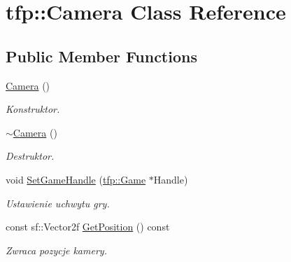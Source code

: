 \hypertarget{classtfp_1_1_camera}{}\section{tfp\+:\+:Camera Class Reference}
\label{classtfp_1_1_camera}
\subsection*{Public Member Functions}
\begin{DoxyCompactItemize}
\item 
\mbox{\label{classtfp_1_1_camera_a9d0ed540630dbb0cfe14ebde50695301}} 
\mbox{\hyperlink{classtfp_1_1_camera_a9d0ed540630dbb0cfe14ebde50695301}{Camera}} ()
\begin{DoxyCompactList}\small\item\em Konstruktor. \end{DoxyCompactList}\item 
\mbox{\label{classtfp_1_1_camera_a92dd247d1ec0dc12065eabcbba7a046a}} 
\mbox{\hyperlink{classtfp_1_1_camera_a92dd247d1ec0dc12065eabcbba7a046a}{$\sim$\+Camera}} ()
\begin{DoxyCompactList}\small\item\em Destruktor. \end{DoxyCompactList}\item 
\mbox{\label{classtfp_1_1_camera_a2f371c02cb5d8da89ddfff4509ef6091}} 
void \mbox{\hyperlink{classtfp_1_1_camera_a2f371c02cb5d8da89ddfff4509ef6091}{Set\+Game\+Handle}} (\mbox{\hyperlink{classtfp_1_1_game}{tfp\+::\+Game}} $\ast$Handle)
\begin{DoxyCompactList}\small\item\em Ustawienie uchwytu gry. \end{DoxyCompactList}\item 
\mbox{\label{classtfp_1_1_camera_a7766106c616d7ca54b110957aef55d4d}} 
const sf\+::\+Vector2f \mbox{\hyperlink{classtfp_1_1_camera_a7766106c616d7ca54b110957aef55d4d}{Get\+Position}} () const
\begin{DoxyCompactList}\small\item\em Zwraca pozycje kamery. \end{DoxyCompactList}\item 

\end{DoxyCompactItemize}
